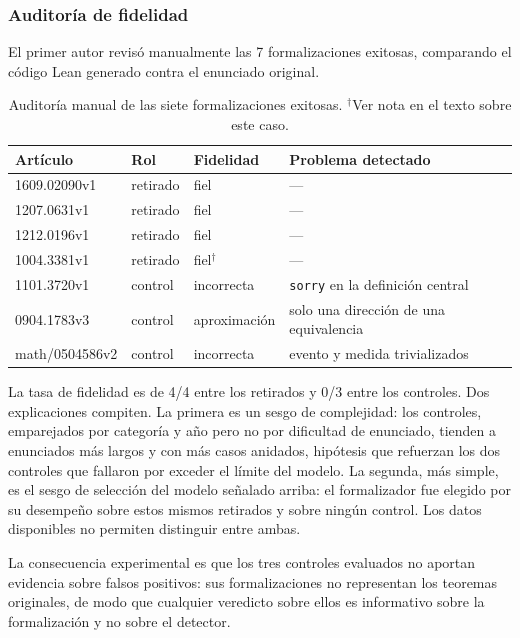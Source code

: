 \documentclass[12pt,a4paper]{article}
\theoremstyle{remark}
\begin{document}
\subsubsection{Auditoría de fidelidad}

El primer autor revisó manualmente las 7 formalizaciones exitosas, comparando el código Lean generado contra el enunciado original.

\begin{table}[htbp]
\centering
\small
\begin{tabular}{llll}
\toprule
Artículo & Rol & Fidelidad & Problema detectado \\
\midrule
1609.02090v1   & retirado & fiel & --- \\
1207.0631v1    & retirado & fiel & --- \\
1212.0196v1    & retirado & fiel & --- \\
1004.3381v1    & retirado & fiel$^{\dagger}$ & --- \\
1101.3720v1    & control  & incorrecta & \texttt{sorry} en la definición central \\
0904.1783v3    & control  & aproximación & solo una dirección de una equivalencia \\
math/0504586v2 & control  & incorrecta & evento y medida trivializados \\
\bottomrule
\end{tabular}
\caption{Auditoría manual de las siete formalizaciones exitosas. $^{\dagger}$Ver nota en el texto sobre este caso.}
\label{tab:fidelidad}
\end{table}

La tasa de fidelidad es de 4/4 entre los retirados y 0/3 entre los controles. Dos explicaciones compiten. La primera es un sesgo de complejidad: los controles, emparejados por categoría y año pero no por dificultad de enunciado, tienden a enunciados más largos y con más casos anidados, hipótesis que refuerzan los dos controles que fallaron por exceder el límite del modelo. La segunda, más simple, es el sesgo de selección del modelo señalado arriba: el formalizador fue elegido por su desempeño sobre estos mismos retirados y sobre ningún control. Los datos disponibles no permiten distinguir entre ambas.

La consecuencia experimental es que los tres controles evaluados no aportan evidencia sobre falsos positivos: sus formalizaciones no representan los teoremas originales, de modo que cualquier veredicto sobre ellos es informativo sobre la formalización y no sobre el detector.
\end{document}
